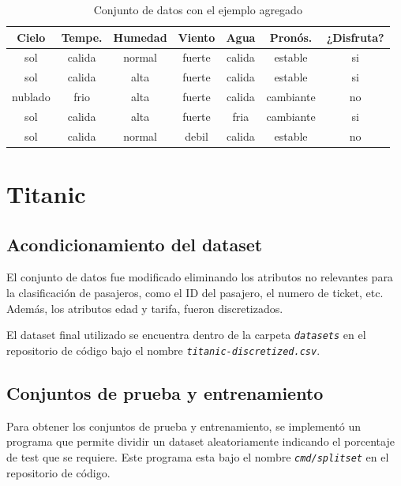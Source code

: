 \documentclass[a4paper]{article}
\newcommand{\italic}[1]{\textit{\texttt{#1}}}
\begin{document}
\begin{table}[h]
  \centering
  \begin{tabular}{ccccccc}
  Cielo                          & Tempe. & Humedad & Viento                        & Agua   & Pronós.    & ¿Disfruta?                \\ \hline
  {\color[HTML]{009901} sol}     & calida & normal  & {\color[HTML]{009901} fuerte} & calida & estable   & {\color[HTML]{009901} si} \\
  {\color[HTML]{009901} sol}     & calida & alta    & fuerte                        & calida & estable   & {\color[HTML]{009901} si} \\
  {\color[HTML]{CB0000} nublado} & frio   & alta    & fuerte                        & calida & cambiante & {\color[HTML]{CB0000} no} \\
  {\color[HTML]{009901} sol}     & calida & alta    & fuerte                        & fria   & cambiante & {\color[HTML]{009901} si} \\
  {\color[HTML]{009901} sol}     & calida & normal  & {\color[HTML]{CB0000} debil}  & calida & estable   & {\color[HTML]{CB0000} no}
  \end{tabular}
  \caption{Conjunto de datos con el ejemplo agregado}
  \label{tab:dataset-2}
  \end{table}

\newpage
\section{Titanic}

\subsection{Acondicionamiento del dataset}
El conjunto de datos fue modificado eliminando los atributos no relevantes para la clasificación de pasajeros, como el ID del pasajero, el numero de ticket, etc. Además, los atributos edad y tarifa, fueron discretizados.

El dataset final utilizado se encuentra dentro de la carpeta \italic{datasets} en el repositorio de código bajo el nombre \italic{titanic-discretized.csv}. 

\subsection{Conjuntos de prueba y entrenamiento}
Para obtener los conjuntos de prueba y entrenamiento, se implementó un programa que permite dividir un dataset aleatoriamente indicando el porcentaje de test que se requiere. Este programa esta bajo el nombre \italic{cmd/splitset} en el repositorio de código.
\end{document}
